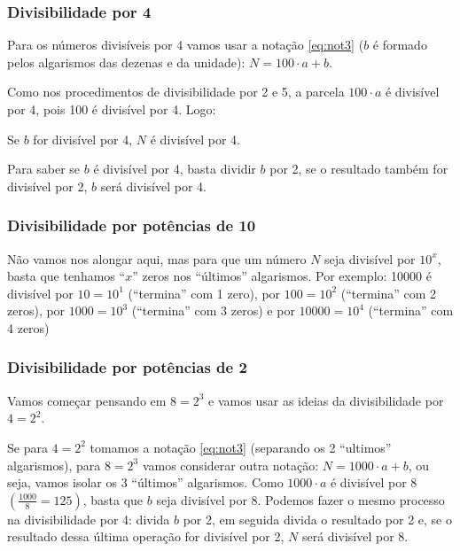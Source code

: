\documentclass[12pt,a4paper]{article}
\begin{document}
		\newpage
		
		\subsubsection{Divisibilidade por 4}
		Para os números divisíveis por 4 vamos usar a notação \ref{eq:not3} ($b$ é formado pelos algarismos das dezenas e da unidade): $N = 100 \cdot a + b$.
		
		Como nos procedimentos de divisibilidade por 2 e 5, a parcela $100 \cdot a$ é divisível por 4, pois 100 é divisível por 4. Logo:
		
		\begin{meudestaque}
			Se $b$ for divisível por 4, $N$ é divisível por 4.
		\end{meudestaque}
		
		Para saber se $b$ é divisível por 4, basta dividir $b$ por 2, se o resultado também for divisível por 2, $b$ será divisível por 4.
		
		\subsubsection{Divisibilidade por potências de 10}
		
		Não vamos nos alongar aqui, mas para que um número $N$ seja divisível por $10^x$, basta que tenhamos ``$x$'' zeros nos ``últimos'' algarismos. Por exemplo: 10000 é divisível por $10 = 10^1$ (``termina'' com 1 zero), por $100 = 10^2$ (``termina'' com 2 zeros), por $1000 = 10^3$ (``termina'' com 3 zeros) e por $10000 = 10^4$ (``termina'' com 4 zeros)
		
		\subsubsection{Divisibilidade por potências de 2}
		
		Vamos começar pensando em $8 = 2^3$ e vamos usar as ideias da divisibilidade por $4 = 2^2$.
		
		Se para $4 = 2^2$ tomamos a notação \ref{eq:not3} (separando os 2 ``ultimos'' algarismos), para $8 = 2^3$ vamos considerar outra notação: $N = 1000 \cdot a + b$, ou seja, vamos isolar os 3 ``últimos'' algarismos. Como $1000 \cdot a$ é divisível por 8 $\left( \frac{1000}{8} = 125 \right)$, basta que $b$ seja divisível por 8. Podemos fazer o mesmo processo na divisibilidade por 4: divida $b$ por 2, em seguida divida o resultado por 2 e, se o resultado dessa última operação for divisível por 2, $N$ será divisível por 8.
		
\end{document}
